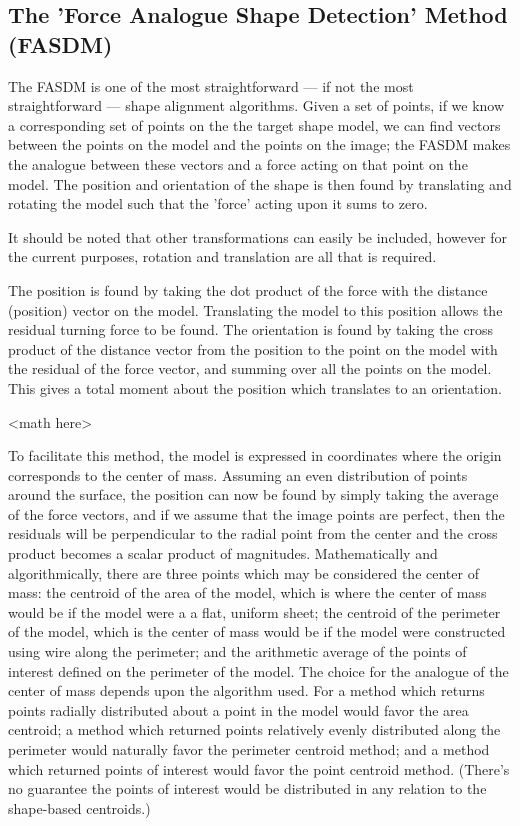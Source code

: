 \subsection{The 'Force Analogue Shape Detection' Method (FASDM)}\label{sec:ForceAnalogue}
The FASDM is one of the most straightforward --- if not the most straightforward --- shape alignment algorithms. Given a set of points, if we know a corresponding set of points on the the target shape model, we can find vectors between the points on the model and the points on the image; the FASDM makes the analogue between these vectors and a force acting on that point on the model. The position and orientation of the shape is then found by translating and rotating the model such that the 'force' acting upon it sums to zero. 

It should be noted that other transformations can easily be included, however for the current purposes, rotation and translation are all that is required.

The position is found by taking the dot product of the force with the distance (position) vector on the model. Translating the model to this position allows the residual turning force to be found. The orientation is found by taking the cross product of the distance vector from the position to the point on the model with the residual of the force vector, and summing over all the points on the model. This gives a total moment about the position which translates to an orientation.

<math here>

To facilitate this method, the model is expressed in coordinates where the origin corresponds to the center of mass. Assuming an even distribution of points around the surface, the position can now be found by simply taking the average of the force vectors, and if we assume that the image points are perfect, then the residuals will be perpendicular to the radial point from the center and the cross product becomes a scalar product of magnitudes. Mathematically and algorithmically, there are three points which may be considered the center of mass: the centroid of the area of the model, which is where the center of mass would be if the model were a a flat, uniform sheet; the centroid of the perimeter of the model, which is the center of mass would be if the model were constructed using wire along the perimeter; and the arithmetic average of the points of interest defined on the perimeter of the model. The choice for the analogue of the center of mass depends upon the algorithm used. For a method which returns points radially distributed about a point in the model would favor the area centroid; a method which returned points relatively evenly distributed along the perimeter would naturally favor the perimeter centroid method; and a method which returned points of interest would favor the point centroid method. (There's no guarantee the points of interest would be distributed in any relation to the shape-based centroids.)


